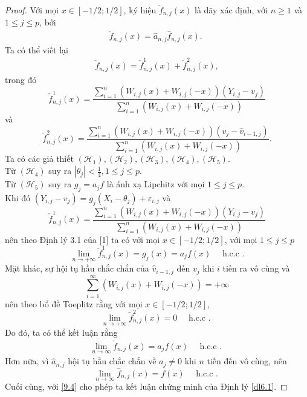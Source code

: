 \begin{proof}
Với mọi $x \in[-1 / 2 ; 1 / 2]$, ký hiệu $\check{f}_{n, j}(x)$ là dãy xác định, với $n \geq 1$ và $1 \leq j \leq p$, bởi
\begin{align}
    \check{f}_{n, j}(x)=\widehat{a}_{n, j} \widehat{f}_{n, j}(x) \text {. }
    \label{9.1}
\end{align}
Ta có thể viết lại
\begin{align}
    \check{f}_{n, j}(x)=\check{f}_{n, j}^{1}(x)+\check{f}_{n, j}^{2}(x),
    \label{9.2}
\end{align}
trong đó
$$
\check{f}_{n, j}^{1}(x)=\frac{\sum_{i=1}^{n}\left(W_{i, j}(x)+W_{i, j}(-x)\right)\left(Y_{i, j}-v_{j}\right)}{\sum_{i=1}^{n}\left(W_{i, j}(x)+W_{i, j}(-x)\right)}
$$
và
$$
\check{f}_{n, j}^{2}(x)=\frac{\sum_{i=1}^{n}\left(W_{i, j}(x)+W_{i, j}(-x)\right)\left(v_{j}-\widehat{v}_{i-1, j}\right)}{\sum_{i=1}^{n}\left(W_{i, j}(x)+W_{i, j}(-x)\right)}.
$$
Ta có các giả thiết $\left(\mathcal{H}_1\right), \left(\mathcal{H}_2\right),\left(\mathcal{H}_3\right), \left(\mathcal{H}_4\right), \left(\mathcal{H}_5\right)$. \\
Từ $\left(\mathcal{H}_4\right)$ suy ra $|\theta_j| < \frac{1}{4}, 1\leq j \leq p$.\\
Từ $\left(\mathcal{H}_5\right)$ suy ra $g_j=a_j f$ là ánh xạ Lipchitz với mọi $1\leq j \leq p$. \\
Khi đó $\left(Y_{i, j}-v_{j}\right)=g_j(X_i-\theta_j)+\varepsilon_{i,j}$ và 
$$
\check{f}_{n, j}^{1}(x)=\frac{\sum_{i=1}^{n}\left(W_{i, j}(x)+W_{i, j}(-x)\right)\left(Y_{i, j}-v_{j}\right)}{\sum_{i=1}^{n}\left(W_{i, j}(x)+W_{i, j}(-x)\right)}
$$
nên theo Định lý 3.1 của [1] ta có với mọi $x \in[-1 / 2 ; 1 / 2]$, với mọi $1\leq j \leq p$
$$
\lim _{n \rightarrow+\infty} \check{f}_{n, j}^{1}(x)= g_{j}(x) = a_{j} f(x) \quad \text { h.c.c .}
$$
Mặt khác, sự hội tụ hầu chắc chắn của $\widehat{v}_{i-1, j}$ đến $v_{j}$ khi $i$ tiến ra vô cùng và 
$$\sum_{i=1}^{\infty}\left(W_{i, j}(x)+W_{i, j}(-x)\right) = +\infty$$
nên theo bổ đề Toeplitz
\noindent rằng với mọi $x \in[-1 / 2 ; 1 / 2]$,
$$
\lim _{n \rightarrow+\infty} \check{f}_{n, j}^{2}(x)=0 \quad \text { h.c.c . }
$$
Do đó, ta có thể kết luận rằng
\begin{align}
    \lim _{n \rightarrow \infty} \check{f}_{n, j}(x)=a_{j} f(x) \quad \text { h.c.c . }
    \label{9.3}
\end{align}
Hơn nữa, vì $\widehat{a}_{n, j}$ hội tụ hầu chắc chắn về $a_{j} \neq 0$ khi $n$ tiến đến vô cùng, nên
$$
\lim _{n \rightarrow \infty} \widehat{f}_{n, j}(x)=f(x) \quad \text { h.c.c . }
$$
Cuối cùng,  với \ref{9.4} cho phép ta kết luận chứng minh của Định lý \ref{dl6.1}.
\end{proof}

